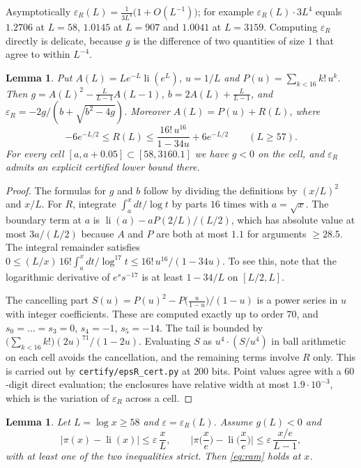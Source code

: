 \documentclass[11pt]{amsart}
\numberwithin{equation}{section}
\newtheorem{lemma}[theorem]{Lemma}
\theoremstyle{definition}
\theoremstyle{remark}
\newcommand{\li}{\operatorname{li}}
\newcommand{\eps}{\varepsilon}
\newcommand{\code}[1]{\texttt{#1}}
\begin{document}
Asymptotically $\eps_R(L) = \frac{1}{3L^4}\big(1+O(L^{-1})\big)$; for example $\eps_R(L)\cdot 3L^4$ equals $1.2706$ at $L = 58$, $1.0145$ at $L = 907$ and $1.0041$ at $L = 3159$.
Computing $\eps_R$ directly is delicate, because $g$ is the difference of two quantities of size $1$ that agree to within $L^{-4}$.

\begin{lemma}\label{lem:epsR}
Put $A(L) = L e^{-L}\li(e^L)$, $u = 1/L$ and $P(u) = \sum_{k<16} k!\,u^k$.
Then $g = A(L)^2 - \frac{L}{L-1}A(L-1)$, $b = 2A(L) + \frac{L}{L-1}$, and $\eps_R = -2g/(b + \sqrt{b^2-4g})$.
Moreover $A(L) = P(u) + R(L)$, where
\[
-6e^{-L/2} \le R(L) \le \frac{16!\,u^{16}}{1 - 34u} + 6e^{-L/2} \qquad (L \ge 57).
\]
For every cell $[a, a+0.05] \subset [58, 3160.1]$ we have $g < 0$ on the cell, and $\eps_R$ admits an explicit certified lower bound there.
\end{lemma}

\begin{proof}
The formulas for $g$ and $b$ follow by dividing the definitions by $(x/L)^2$ and $x/L$.
For $R$, integrate $\int_a^x dt/\log t$ by parts $16$ times with $a = \sqrt x$.
The boundary term at $a$ is $\li(a) - aP(2/L)/(L/2)$, which has absolute value at most $3a/(L/2)$ because $A$ and $P$ are both at most $1.1$ for arguments $\ge 28.5$.
The integral remainder satisfies $0 \le (L/x)\,16!\int_a^x dt/\log^{17}t \le 16!\,u^{16}/(1-34u)$.
To see this, note that the logarithmic derivative of $e^s s^{-17}$ is at least $1 - 34/L$ on $[L/2, L]$.

The cancelling part $S(u) = P(u)^2 - P\big(\tfrac{u}{1-u}\big)/(1-u)$ is a power series in $u$ with integer coefficients.
These are computed exactly up to order $70$, and $s_0 = \dots = s_3 = 0$, $s_4 = -1$, $s_5 = -14$.
The tail is bounded by $\big(\sum_{k<16}k!\big)(2u)^{71}/(1-2u)$.
Evaluating $S$ as $u^4\cdot(S/u^4)$ in ball arithmetic on each cell avoids the cancellation, and the remaining terms involve $R$ only.
This is carried out by \code{certify/epsR\_cert.py} at $200$ bits.
Point values agree with a $60$-digit direct evaluation; the enclosures have relative width at most $1.9\cdot 10^{-3}$, which is the variation of $\eps_R$ across a cell.
\end{proof}

\begin{lemma}\label{lem:reduce}
Let $L = \log x \ge 58$ and $\eps = \eps_R(L)$.
Assume $g(L) < 0$ and
\begin{equation}\label{eq:pibounds}
|\pi(x) - \li(x)| \le \eps\, \frac{x}{L}, \qquad \Big|\pi\Big(\frac xe\Big) - \li\Big(\frac xe\Big)\Big| \le \eps\, \frac{x/e}{L-1},
\end{equation}
with at least one of the two inequalities strict.
Then \eqref{eq:ram} holds at $x$.
\end{lemma}
\end{document}
